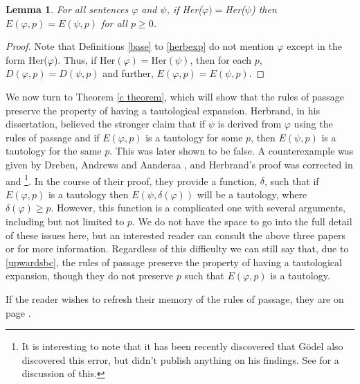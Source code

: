 \documentclass[a4paper,12pt]{report}
\newtheorem{lem}{Lemma}[section]
\theoremstyle{definition}
\begin{document}
\begin{lem}
\label{her eq}
For all sentences $\varphi$ and $\psi$, if Her($\varphi) = $Her($\psi$) then $E(\varphi, p) = E(\psi, p)$ for all $p \ge 0$.
\end{lem}
\begin{proof}
Note that Definitions \ref{base} to \ref{herbexp} do not mention $\varphi$ except in the form Her($\varphi$). Thus, if $\mbox{Her}(\varphi) = \mbox{Her}(\psi)$, then for each $p$, $D(\varphi, p) = D(\psi, p)$ and further, $E(\varphi, p) = E(\psi, p)$.
\end{proof}

We now turn to Theorem \ref{c theorem}, which will show that the rules of passage preserve the property of having a tautological expansion. Herbrand, in his dissertation, believed the stronger claim that if $\psi$ is derived from $\varphi$ using the rules of passage and if $E(\varphi, p)$ is a tautology for some $p$, then $E(\psi, p)$ is a tautology for the same $p$. This was later shown to be false. A counterexample was given by Dreben, Andrews and Aanderaa \cite{Dreb1}, and Herbrand's proof was corrected in \cite{Dreb2} and \cite{Dreb3}\footnote{It is interesting to note that it has been recently discovered that G\"o{del} also discovered this error, but didn't publish anything on his findings. See \cite{goldfarb93} for a discussion of this.}. In the course of their proof, they provide a function, $\delta$, such that if $E(\varphi, p)$ is a tautology then $E(\psi, \delta(\varphi))$ will be a tautology, where $\delta(\varphi) \ge p$. However, this function is a complicated one with several arguments, including but not limited to $p$. We do not have the space to go into the full detail of these issues here, but an interested reader can consult the above three papers or \cite{goldfarb93} for more information. Regardless of this difficulty we can still say that, due to \ref{upwardsbc}, the rules of passage preserve the property of having a tautological expansion, though they do not preserve $p$ such that $E(\varphi, p)$ is a tautology.

If the reader wishes to refresh their memory of the rules of passage, they are on page \pageref{rulesofpassage}.
\end{document}

